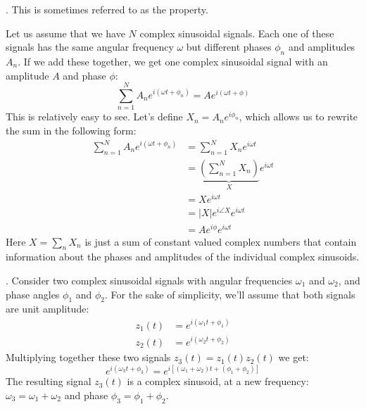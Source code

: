 .
This is sometimes referred to as the
\emph{} property.

Let us assume that we have $N$ complex sinusoidal signals. Each one of these signals has
the same angular frequency $\omega$ but different phases $\phi_n$ and amplitudes $A_n$.
If we add these together, we get one complex sinusoidal signal with an amplitude $A$ and phase $\phi$:
\begin{equation}
  \sum_{n=1}^N A_n e^{i(\omega t + \phi_n)} = A e^{i (\omega t + \phi)}
\end{equation}
This is relatively easy to see. Let's define $X_n = A_n e^{i\phi_n}$,
which allows us to rewrite the sum in the following form:
\begin{align}
  \sum_{n=1}^N A_n e^{i(\omega t + \phi_n)} & = \sum_{n=1}^N X_n e^{i\omega t}                               \\
                                            & = \underbrace{\left(\sum_{n=1}^N X_n\right)}_{X} e^{i\omega t} \\
                                            & = X e^{i\omega t}                                              \\
                                            & = |X| e^{i\angle X} e^{i\omega t}                              \\
                                            & = A e^{i \phi} e^{i\omega t}
  \label{eq:sum_sinusoids}
\end{align}
Here $X=\sum_n X_n$ is just a sum of constant valued complex numbers that
contain information about the phases and amplitudes of the individual complex sinusoids.

.
Consider two complex sinusoidal signals with angular frequencies $\omega_1$ and $\omega_2$,
and phase angles $\phi_1$ and $\phi_2$. For the sake of simplicity, we'll assume that both signals are unit amplitude:
\begin{align}
  z_1(t) & =  e^{i(\omega_1 t + \phi_1)} \\
  z_2(t) & =  e^{i(\omega_2 t + \phi_2)}
\end{align}
Multiplying together these two signals $z_3(t) = z_1(t)z_2(t)$ we get:
\begin{equation}
  \boxed{e^{i(\omega_3 t + \phi_3)}  = e^{i[(\omega_1 + \omega_2) t + (\phi_1+\phi_2)]}}
  \label{eq:freqmix}
\end{equation}
The resulting signal $z_3(t)$ is a complex sinusoid, at a new frequency: $\omega_3 = \omega_1 + \omega_2$ and
phase $\phi_3=\phi_1+\phi_2$.

